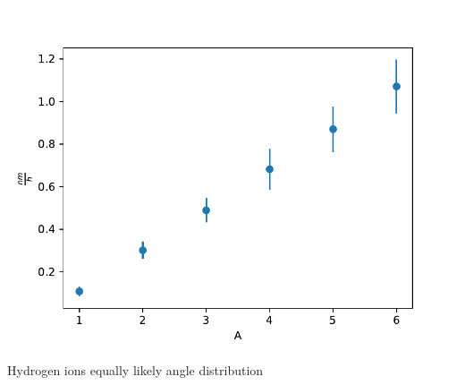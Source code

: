 \documentclass{beamer} %
\begin{document}
\begin{frame}
\begin{minipage}{0.49\textwidth}
        \includegraphics[width=1.1\textwidth]{figures/CurrentVary_H2_100sccm_sput.pdf}
    \end{minipage}
    \hspace{0.5cm}
    \begin{minipage}{0.39\textwidth}
        Hydrogen ions
        equally likely angle distribution
    \end{minipage}
\end{frame}
\end{document}
